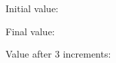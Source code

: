 \documentclass{article}
\begin{document}
\begin{listing-tex}

  Initial value: 

  Final value: 


  Value after 3 increments: 

\end{listing-tex}
\end{document}
